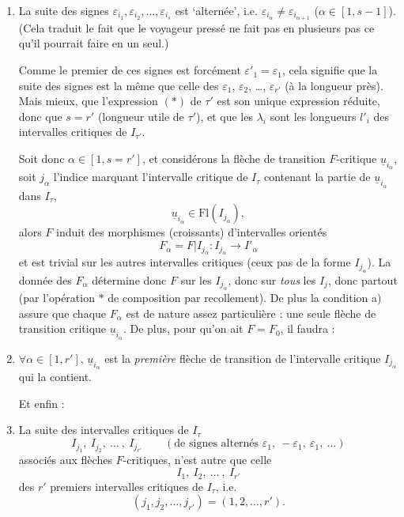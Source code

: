 \documentclass[11pt]{article}
\newcommand{\printedpage}[1]{\marginpar{\footnotesize p.~#1}}
\newcommand{\msp}[1]{\marginpar{\vspace*{10pt}\footnotesize [#1]}}
\newcommand{\ul}[1]{\underline{#1}}
\begin{document}
\begin{enumerate}[label={}, leftmargin=*]
\item[a)] La suite des signes $\varepsilon_{i_1},\varepsilon_{i_2},\dots,\varepsilon_{i_s}$ est ‘alternée’, i.e. $\varepsilon_{i_\alpha}\neq\varepsilon_{i_{\alpha+1}}$ ($\alpha\in[1,s-1]$). (Cela traduit le fait que le voyageur pressé ne fait pas en plusieurs pas ce qu'il pourrait faire en un seul.)

Comme le premier de ces signes est forcément $\varepsilon'_1=\varepsilon_1$, cela signifie que la suite des signes est la même que celle des $\varepsilon_1$, $\varepsilon_2$, \dots, $\varepsilon_{r'}$ (à la longueur près). Mais mieux, que l'expression $(*)$ de $\tau'$ est son unique expression réduite, donc que $s=r'$ (longueur utile de $\tau'$), et que les $\lambda_i$ sont les longueurs $l'_i$ des intervalles critiques de $I_{\tau'}$.

\printedpage{57}

\msp{page 88}
Soit donc $\alpha\in[1,s=r']$, et considérons la flèche de transition $F$-critique $\ul{u}_{i_\alpha}$, soit $j_\alpha$ l'indice marquant l'intervalle critique de $I_\tau$ contenant la partie de $\ul{u}_{i_\alpha}$ dans $I_\tau$,
\[
\ul{u}_{i_\alpha}\in\mathrm{Fl}(I_{j_\alpha}),
\]
alors $F$ induit des morphismes (croissants) d'intervalles orientés
\[
F_\alpha=F|I_{j_\alpha}:I_{j_\alpha}\longrightarrow I'_\alpha
\]
et est trivial sur les autres intervalles critiques (ceux pas de la forme $I_{j_\alpha}$). La donnée des $F_\alpha$ détermine donc $F$ sur les $I_{j_\alpha}$, donc sur \textit{tous} les $I_j$, donc partout (par l'opération $*$ de composition par recollement). De plus la condition a) assure que chaque $F_\alpha$ est de nature assez particulière : une seule flèche de transition critique $\ul{u}_{i_\alpha}$. De plus, pour qu'on ait $F=F_0$, il faudra :

\item[b)] $\forall\alpha\in[1,r']$, $\ul{u}_{i_\alpha}$ est la \textit{première} flèche de transition de l'intervalle critique $I_{j_\alpha}$ qui la contient.

Et enfin :

\item[c)] La suite des intervalles critiques de $I_\tau$
\[
I_{j_1},\ I_{j_2},\ \dots\ ,\ I_{j_{r'}}\qquad(\text{de signes alternés }\varepsilon_1,\ -\varepsilon_1,\ \varepsilon_1,\ \ldots)
\]
associés aux flèches $F$-critiques, n'est autre que celle
\[
I_1,\ I_2,\ \dots\ ,\ I_{r'}
\]
des $r'$ premiers intervalles critiques de $I_\tau$, i.e.
\[
(j_1,j_2,\dots,j_{r'})=(1,2,\dots,r').
\]
\end{enumerate}
\end{document}
